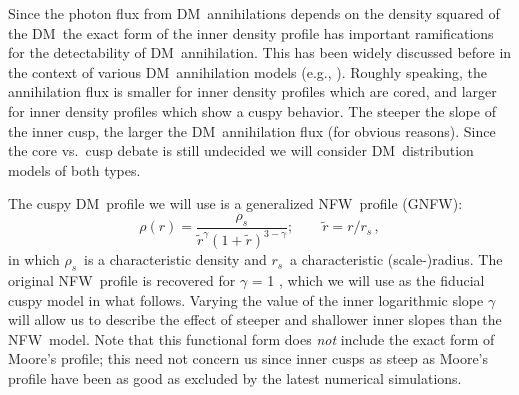 \documentclass[aps,prd,twocolumn,amsmath,amssymb,floatfix,nofootinbib,10pt]{revtex4}
\newcommand{\eg}{e.g.}
\newcommand{\NFW}{NFW}
\newcommand{\GNFW}{G\NFW}
\newcommand{\DM}{DM}
\newcommand{\redr}{\ensuremath{\tilde{r}}}
\newcommand{\rhos}{\ensuremath{\rho_s}}
\newcommand{\rs}{\ensuremath{r_s}}
\begin{document}
Since the photon flux from \DM\ annihilations depends on the density
squared of the \DM\, the exact form of the inner density profile has
important ramifications for the detectability of \DM\
annihilation. This has been widely discussed before in the context of
various \DM\ annihilation models (\eg,
\cite{1998APh.....9..137B,1999PhRvL..83.1719G,2000PhRvD..62l3005C,2000PhLB..494..181G,2002PhRvD..66b3509T,2002PhRvD..66l3502U,2003MNRAS.339..505T,2004ApJ...601...47A,2008JCAP...07..013B,2008arXiv0811.3744B,2008arXiv0812.3895B}). Roughly
speaking, the annihilation flux is smaller for inner density profiles
which are cored, and larger for inner density profiles which show a
cuspy behavior. The steeper the slope of the inner cusp, the larger
the \DM\ annihilation flux (for obvious reasons). Since the core
vs.~cusp debate is still undecided we will consider \DM\ distribution
models of both types.

The cuspy \DM\ profile we will use is a generalized \NFW\ profile (\GNFW):
\begin{equation}\label{eq:NFW}
\rho(r) = \frac{\rhos}{\redr^\gamma\left(1+\redr\right)^{3-\gamma}};\qquad \redr = r/\rs\, ,
\end{equation}
in which \rhos\ is a characteristic density and \rs\ a characteristic
(scale-)radius.  The original \NFW\ profile is recovered for $\gamma$
= 1 \cite{1997ApJ...490..493N}, which we will use as the fiducial
cuspy model in what follows. Varying the value of the inner
logarithmic slope $\gamma$ will allow us to describe the effect of
steeper and shallower inner slopes than the \NFW\ model. Note that
this functional form does \emph{not} include the exact form of Moore's
profile; this need not concern us since inner cusps as steep as
Moore's profile have been as good as excluded by the latest numerical
simulations.
\end{document}
